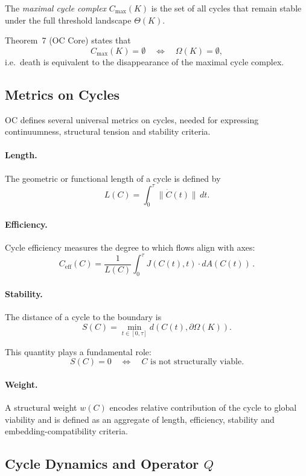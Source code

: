 The \emph{maximal cycle complex} \(C_{\max}(K)\) is the set of all cycles
that remain stable under the full threshold landscape \(\Theta(K)\).

Theorem~7 (OC Core) states that
\[
  C_{\max}(K) = \emptyset
  \quad\Longleftrightarrow\quad
  \Omega(K) = \emptyset,
\]
i.e.\ death is equivalent to the disappearance of the maximal cycle complex.

\subsection{Metrics on Cycles}

OC defines several universal metrics on cycles, needed for expressing
continuumness, structural tension and stability criteria.

\paragraph{Length.}
The geometric or functional length of a cycle is defined by
\[
  L(C) = \int_{0}^{\tau} \big\|\dot{C}(t)\big\|\, dt.
\]

\paragraph{Efficiency.}
Cycle efficiency measures the degree to which flows align with axes:
\[
  C_{\mathrm{eff}}(C)
  = \frac{1}{L(C)} \int_0^{\tau}
      J(C(t),t)\cdot dA(C(t))
    \,.
\]

\paragraph{Stability.}
The distance of a cycle to the boundary is
\[
  S(C) = \min_{t\in[0,\tau]}
         d\!\left(C(t),\partial\Omega(K)\right).
\]

This quantity plays a fundamental role:
\[
  S(C)=0
  \quad\Longleftrightarrow\quad
  C \text{ is not structurally viable}.
\]

\paragraph{Weight.}
A structural weight \(w(C)\) encodes relative contribution of the cycle to
global viability and is defined as an aggregate of length, efficiency,
stability and embedding-compatibility criteria.

\subsection{Cycle Dynamics and Operator \texorpdfstring{\(Q\)}{Q}}

